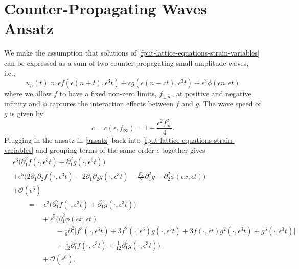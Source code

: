 
\section{Counter-Propagating Waves Ansatz}

We make the assumption that solutions of \cref{fput-lattice-equations-strain-variables} can be expressed as a sum of two counter-propagating small-amplitude waves, i.e., 
\begin{equation}\label{ansatz}
	u_n(t) \approx \epsilon f(\epsilon(n+t), \epsilon^3t) + \epsilon g(\epsilon(n-ct), \epsilon^3 t) + \epsilon^3\phi(\epsilon n, \epsilon t)
\end{equation}
where we allow \(f\) to have a fixed non-zero limits, \(f_{\pm\infty}\), at positive and negative infinity and \(\phi\) captures the interaction effects between \(f\) and \(g\). The wave speed of \(g\) is given by
\begin{equation}\label{ansatz-wave-speed}
	c = c(\epsilon, f_\infty) = 1 - \frac{\epsilon^2 f_\infty^2}{4}.
\end{equation}
Plugging in the ansatz in \cref{ansatz} back into \cref{fput-lattice-equations-strain-variables} and grouping terms of the same order \(\epsilon\) together gives
\begin{equation}
	\begin{aligned}
		&\epsilon^3 \Big(\partial_1^2 f(\cdot, \epsilon^3 t) + \partial_1^2 g(\cdot, \epsilon^3 t)\Big) \\
		&+ \epsilon^5 \Big( 2 \partial_1\partial_2 f(\cdot, \epsilon^3t) - 2 \partial_1\partial_2 g(\cdot, \epsilon^3 t) - \frac{f_\infty^2} 2 \partial_1^2 g + \partial_2^2 \phi(\epsilon x, \epsilon t)\Big) \\
		&+ \mathcal O(\epsilon^6)\\
		&\qquad = \quad \epsilon^3 \Big(\partial_1^2 f(\cdot, \epsilon^3 t) + \partial_1^2 g(\cdot, \epsilon^3 t)\Big) \\
		&\qquad\qquad + \epsilon^5\Big(\partial_1^2  \phi(\epsilon x, \epsilon t) \\
		&\qquad\qquad\qquad - \frac 1 6 \partial_1^2 \big[f^3(\cdot, \epsilon^3 t ) + 3 f^2(\cdot,\epsilon^3)g(\cdot, \epsilon^3t) + 3 f(\cdot, \epsilon t) g^2(\cdot,\epsilon^3 t) + g^3(\cdot, \epsilon^3 t)\big] \\
		&\qquad\qquad\qquad+ \frac 1 {12} \partial_1^4 f(\cdot, \epsilon^3 t) + \frac 1 {12} \partial_1^4 g(\cdot, \epsilon^3 t)\Big) \\
		&\qquad\qquad+ \mathcal O(\epsilon^6).
	\end{aligned}
\end{equation}
